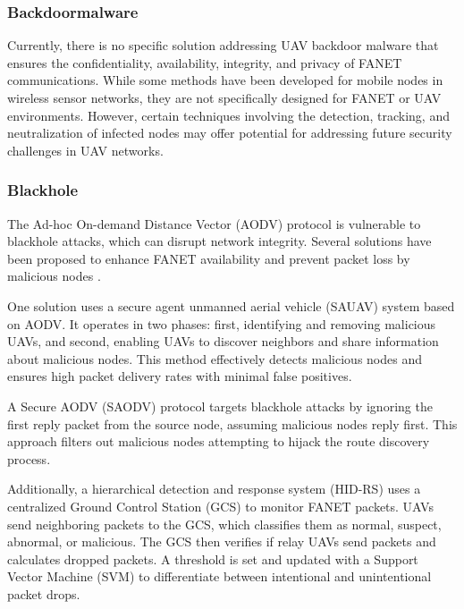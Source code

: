 \subsubsection{Backdoormalware}

Currently, there is no specific solution addressing UAV backdoor malware that ensures the confidentiality, availability, integrity, and privacy of FANET communications. While some methods have been developed for mobile nodes in wireless sensor networks, they are not specifically designed for FANET or UAV environments. However, certain techniques involving the detection, tracking, and neutralization of infected nodes may offer potential for addressing future security challenges in UAV networks.


\subsubsection{Blackhole}

The Ad-hoc On-demand Distance Vector (AODV) protocol is vulnerable to blackhole attacks, which can disrupt network integrity. Several solutions have been proposed to enhance FANET availability and prevent packet loss by malicious nodes \cite{sen2011mechanism}.

One solution \cite{sen2011mechanism} uses a secure agent unmanned aerial vehicle (SAUAV) system based on AODV. It operates in two phases: first, identifying and removing malicious UAVs, and second, enabling UAVs to discover neighbors and share information about malicious nodes. This method effectively detects malicious nodes and ensures high packet delivery rates with minimal false positives.


A Secure AODV (SAODV) protocol targets blackhole attacks by ignoring the first reply packet from the source node, assuming malicious nodes reply first. This approach filters out malicious nodes attempting to hijack the route discovery process.

Additionally, a hierarchical detection and response system (HID-RS) uses a centralized Ground Control Station (GCS) to monitor FANET packets. UAVs send neighboring packets to the GCS, which classifies them as normal, suspect, abnormal, or malicious. The GCS then verifies if relay UAVs send packets and calculates dropped packets. A threshold is set and updated with a Support Vector Machine (SVM) to differentiate between intentional and unintentional packet drops.


